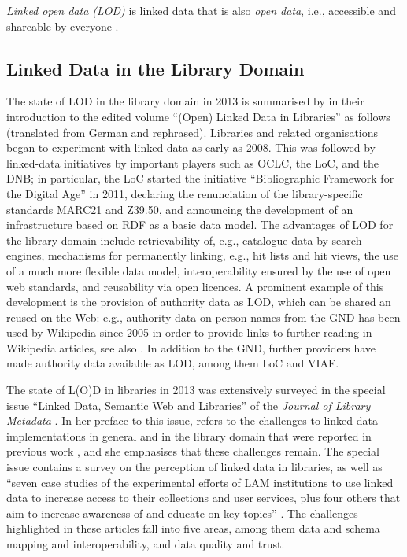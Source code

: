 \emph{Linked open data (LOD)} is linked data that is also \emph{open data},
i.e., accessible and shareable by everyone \autocite{WikiLinkedData}.




\subsection{Linked Data in the Library Domain}

The state of LOD in the library domain in 2013 is summarised by \textcite{Pohl2013}
in their introduction to the edited volume \enquote{(Open) Linked Data in Libraries} \autocite{Danowski2013}
as follows (translated from German and rephrased). Libraries and related organisations
began to experiment with linked data as early as 2008.
This was followed by linked-data initiatives by important players such as
OCLC, the \gls{LoC}, and the \gls{DNB};
in particular, the \gls{LoC} started the initiative \enquote{Bibliographic Framework for the Digital Age} in 2011,
declaring the renunciation of the library-specific standards MARC21 and Z39.50,
and announcing the development of an infrastructure based on \gls{RDF} as a basic data model. The advantages of LOD for the library domain include
retrievability of, e.g., catalogue data by search engines,
mechanisms for permanently linking, e.g., hit lists and hit views,
the use of a much more flexible data model,
interoperability ensured by the use of open web standards,
and reusability via open licences.
A prominent example of this development is the provision of authority data as LOD,
which can be shared an reused on the Web:
e.g., authority data on person names from the \gls{GND} has been used by Wikipedia since 2005
in order to provide links to further reading in Wikipedia articles, see also \autocite{Hengel2005}.
In addition to the \gls{GND}, further providers have made authority data available as LOD,
among them \gls{LoC} and \gls{VIAF}.

The state of L(O)D in libraries in 2013 was extensively surveyed in the special issue
\enquote{Linked Data, Semantic Web and Libraries} of the \emph{Journal of Library Metadata} \autocite{JLM13_2-3}.
In her preface to this issue, \textcite{Bair2013} refers to the challenges to linked data implementations
in general and in the library domain that were reported in previous work
\autocite{Bizer2009,Byrne2010,Gonzalez2011,Alemu2012},
and she emphasises that these challenges remain.
The special issue contains a survey on the perception of linked data in libraries,
as well as
\enquote{seven case studies of the experimental efforts of LAM institutions to use linked data to increase access to their collections and user services, plus four others that aim to increase awareness of and educate on key topics} \autocite[p.76]{Bair2013}.
The challenges highlighted in these articles fall into five areas,
among them data and schema mapping and interoperability, and data quality and trust.

